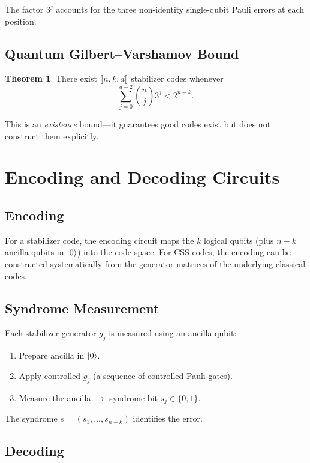 \documentclass[11pt]{article}
\theoremstyle{definition}
\newtheorem{theorem}{Theorem}[section]
\begin{document}
The factor $3^j$ accounts for the three non-identity single-qubit Pauli errors at each position.

\subsection{Quantum Gilbert--Varshamov Bound}

\begin{theorem}
There exist $\llbracket n,k,d\rrbracket$ stabilizer codes whenever
\[
    \sum_{j=0}^{d-2}\binom{n}{j}3^j < 2^{n-k}.
\]
\end{theorem}

This is an \emph{existence} bound---it guarantees good codes exist but does not construct them explicitly.

\section{Encoding and Decoding Circuits}

\subsection{Encoding}

For a stabilizer code, the encoding circuit maps the $k$ logical qubits (plus $n-k$ ancilla qubits in $\ket{0}$) into the code space.  For CSS codes, the encoding can be constructed systematically from the generator matrices of the underlying classical codes.

\subsection{Syndrome Measurement}

Each stabilizer generator $g_j$ is measured using an ancilla qubit:
\begin{enumerate}
    \item Prepare ancilla in $\ket{0}$.
    \item Apply controlled-$g_j$ (a sequence of controlled-Pauli gates).
    \item Measure the ancilla $\to$ syndrome bit $s_j\in\{0,1\}$.
\end{enumerate}
The syndrome $s=(s_1,\dots,s_{n-k})$ identifies the error.

\subsection{Decoding}
\end{document}
